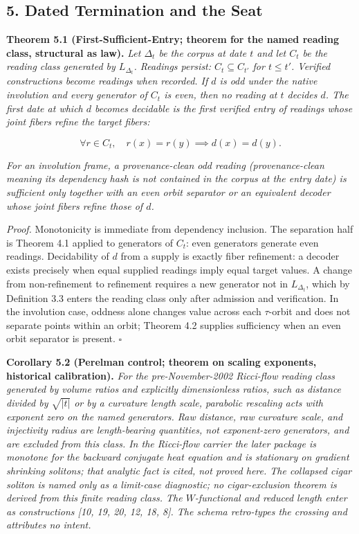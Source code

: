 \documentclass[10pt,twocolumn]{article}
\begin{document}
\subsection{5. Dated Termination and the
Seat}\label{dated-termination-and-the-seat}

\textbf{Theorem 5.1 (First-Sufficient-Entry; theorem for the named
reading class, structural as law).} \emph{Let \(\Delta_t\) be the corpus
at date \(t\) and let \(C_t\) be the reading class generated by
\(L_{\Delta_t}\). Readings persist: \(C_t \subseteq C_{t'}\) for
\(t \le t'\). Verified constructions become readings when recorded. If
\(d\) is odd under the native involution and every generator of \(C_t\)
is even, then no reading at \(t\) decides \(d\). The first date at which
\(d\) becomes decidable is the first verified entry of readings whose
joint fibers refine the target fibers:}

\[\forall r \in C_t,\quad r(x) = r(y) \implies d(x) = d(y).\]

\emph{For an involution frame, a provenance-clean odd reading
(provenance-clean meaning its dependency hash is not contained in the
corpus at the entry date) is sufficient only together with an even orbit
separator or an equivalent decoder whose joint fibers refine those of
\(d\).}

\emph{Proof.} Monotonicity is immediate from dependency inclusion. The
separation half is Theorem 4.1 applied to generators of \(C_t\): even
generators generate even readings. Decidability of \(d\) from a supply
is exactly fiber refinement: a decoder exists precisely when equal
supplied readings imply equal target values. A change from
non-refinement to refinement requires a new generator not in
\(L_{\Delta_t}\), which by Definition 3.3 enters the reading class only
after admission and verification. In the involution case, oddness alone
changes value across each \(\tau\)-orbit and does not separate points
within an orbit; Theorem 4.2 supplies sufficiency when an even orbit
separator is present. \(\square\)

\textbf{Corollary 5.2 (Perelman control; theorem on scaling exponents,
historical calibration).} \emph{For the pre-November-2002 Ricci-flow
reading class generated by volume ratios and explicitly dimensionless
ratios, such as distance divided by \(\sqrt{|t|}\) or by a curvature
length scale, parabolic rescaling acts with exponent zero on the named
generators. Raw distance, raw curvature scale, and injectivity radius
are length-bearing quantities, not exponent-zero generators, and are
excluded from this class. In the Ricci-flow carrier the later package is
monotone for the backward conjugate heat equation and is stationary on
gradient shrinking solitons; that analytic fact is cited, not proved
here. The collapsed cigar soliton is named only as a limit-case
diagnostic; no cigar-exclusion theorem is derived from this finite
reading class. The \(W\)-functional and reduced length enter as
constructions {[}10, 19, 20, 12, 18, 8{]}. The schema retro-types the
crossing and attributes no intent.}
\end{document}
